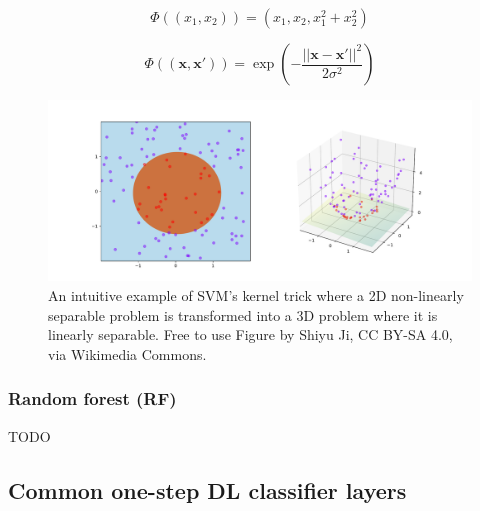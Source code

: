 \begin{equation}
    \label{eq:processing_signals_svm_kernel_function}
    \Phi ((x_1, x_2)) = (x_1, x_2, x_1^2 + x_2^2)
\end{equation}

\begin{equation}
    \label{eq:processing_signals_svm_rbf}
    \Phi ((\mathbf{x}, \mathbf{x}')) = \exp(- \frac{|| \mathbf{x} - \mathbf{x}' ||^2}{2 \sigma^2} )
\end{equation}

\begin{figure}[t]
    \centering
    \includegraphics[width=\linewidth]{../images/pipeline/svm_kernel_trick.pdf}
    \captionsetup{width=0.8\linewidth}
    \captionsetup{justification=centering}
    \caption{An intuitive example of SVM's kernel trick where a 2D non-linearly separable problem is transformed into a 3D problem where it is linearly separable. Free to use Figure by Shiyu Ji, CC BY-SA 4.0, via Wikimedia Commons.}
    \label{fig:processing_signals_svm_kernel}
\end{figure}


\subsubsection{Random forest (RF)}
\label{subsubsec:processing_signals_ml_and_dl_ml_classifiers_rf}


TODO 



\subsection{Common one-step DL classifier layers}
\label{subsec:processing_signals_ml_and_dl_dl_classifiers}

